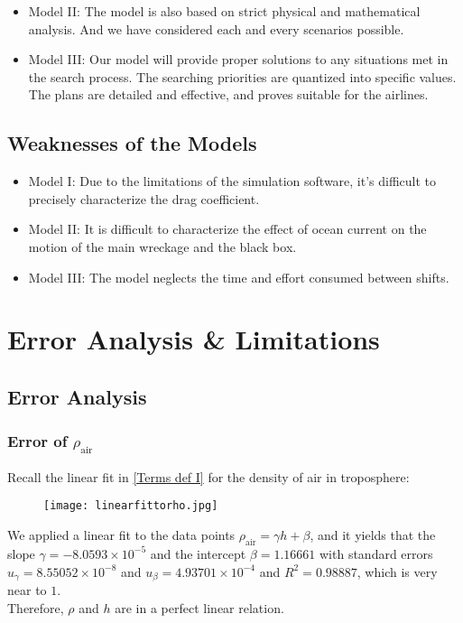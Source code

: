 \documentclass[a4paper,11pt]{article}
\begin{document}
\begin{spacing}{1.0}
\begin{itemize}
	\item Model II: The model is also based on strict physical and mathematical analysis. And we have considered each and every scenarios possible.
	
	\item Model III: Our model will provide proper solutions to any situations met in the search process. The searching priorities are quantized into specific values. The plans are detailed  and effective, and proves suitable for the airlines.
\end{itemize}

\subsection{Weaknesses of the Models}
\begin{itemize}
	\item Model I: Due to the limitations of the simulation software, it's difficult to precisely characterize the drag coefficient.
	
	\item Model II: It is difficult to characterize the effect of ocean current on the motion of the main wreckage and the black box. 
	
	\item Model III: The model neglects the time and effort consumed between shifts. 
	
\end{itemize}

\section{Error Analysis \& Limitations }\label{Error & limitations}

\subsection{Error Analysis}\label{error}

\subsubsection*{Error of $\rho_\text{air}$}
Recall the linear fit in \ref{Terms def I} for the density of air in troposphere:
\begin{figure}[H]
	\centering
	\texttt{[image: linearfittorho.jpg]}
\end{figure}
\noindent We applied a linear fit to the data points \noindent  $\rho_\text{air} = \gamma h + \beta$, and it yields that the slope $\gamma = -8.0593\times 10^{-5} $ and the intercept $\beta = 1.16661 $ with standard errors $u_\gamma = 8.55052\times 10^{-8} $ and $u_\beta = 4.93701\times 10^{-4}$ and $R^2 = 0.98887$, which is very near to $1$.
\\Therefore, $\rho$ and $h$ are in a perfect linear relation.


\end{spacing}
\end{document}
